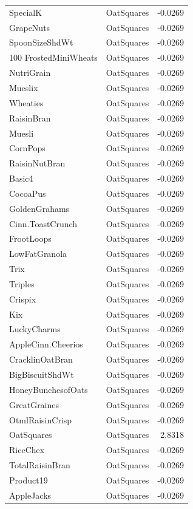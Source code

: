 \begin{longtable}{llr}
SpecialK & OatSquares & -0.0269 \\
GrapeNuts & OatSquares & -0.0269 \\
SpoonSizeShdWt & OatSquares & -0.0269 \\
100%
FrostedMiniWheats & OatSquares & -0.0269 \\
NutriGrain & OatSquares & -0.0269 \\
Mueslix & OatSquares & -0.0269 \\
Wheaties & OatSquares & -0.0269 \\
RaisinBran & OatSquares & -0.0269 \\
Muesli & OatSquares & -0.0269 \\
CornPops & OatSquares & -0.0269 \\
RaisinNutBran & OatSquares & -0.0269 \\
Basic4 & OatSquares & -0.0269 \\
CocoaPus & OatSquares & -0.0269 \\
GoldenGrahams & OatSquares & -0.0269 \\
Cinn.ToastCrunch & OatSquares & -0.0269 \\
FrootLoops & OatSquares & -0.0269 \\
LowFatGranola & OatSquares & -0.0269 \\
Trix & OatSquares & -0.0269 \\
Triples & OatSquares & -0.0269 \\
Crispix & OatSquares & -0.0269 \\
Kix & OatSquares & -0.0269 \\
LuckyCharms & OatSquares & -0.0269 \\
AppleCinn.Cheerios & OatSquares & -0.0269 \\
CracklinOatBran & OatSquares & -0.0269 \\
BigBiscuitShdWt & OatSquares & -0.0269 \\
HoneyBunchesofOats & OatSquares & -0.0269 \\
GreatGraines & OatSquares & -0.0269 \\
OtmlRaisinCrisp & OatSquares & -0.0269 \\
OatSquares & OatSquares & 2.8318 \\
RiceChex & OatSquares & -0.0269 \\
TotalRaisinBran & OatSquares & -0.0269 \\
Product19 & OatSquares & -0.0269 \\
AppleJacks & OatSquares & -0.0269 \\

\end{longtable}

